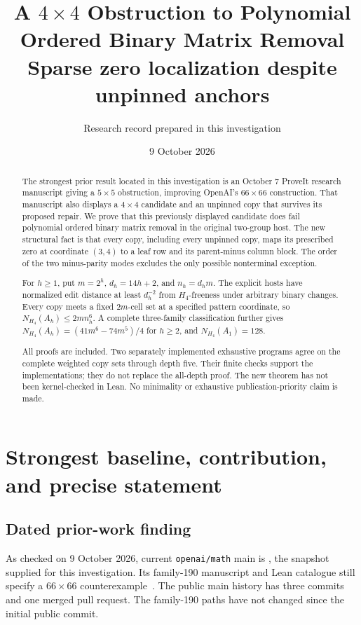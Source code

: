 \documentclass[11pt,a4paper]{article}
\title{\textbf{A \(4\times4\) Obstruction to Polynomial\\Ordered Binary Matrix Removal}\\[6pt]
\large Sparse zero localization despite unpinned anchors}
\author{Research record prepared in this investigation}
\date{9 October 2026}
\theoremstyle{remark}
\newcommand{\Hfour}{H_4}
\begin{document}
\maketitle
\begin{abstract}
The strongest prior result located in this investigation is an October 7
ProveIt research manuscript giving a \(5\times5\) obstruction, improving
OpenAI's \(66\times66\) construction. That manuscript also displays a
\(4\times4\) candidate and an unpinned copy that survives its proposed
repair. We prove that this previously displayed candidate does fail
polynomial ordered binary matrix removal in the original two-group host.
The new structural fact is that every copy, including every unpinned
copy, maps its prescribed zero at coordinate \((3,4)\) to a leaf row and
its parent-minus column block. The order of the two minus-parity modes
excludes the only possible nonterminal exception.

For \(h\ge1\), put \(m=2^h\), \(d_h=14h+2\), and \(n_h=d_hm\).
The explicit hosts have normalized edit distance at least \(d_h^{-2}\)
from \(\Hfour\)-freeness under arbitrary binary changes. Every copy
meets a fixed \(2m\)-cell set at a specified pattern coordinate, so
\(N_{\Hfour}(A_h)\le2mn_h^6\). A complete three-family classification
further gives \(N_{\Hfour}(A_h)=(41m^6-74m^5)/4\) for \(h\ge2\),
and \(N_{\Hfour}(A_1)=128\).

All proofs are included. Two separately implemented exhaustive programs
agree on the complete weighted copy sets through depth five. Their
finite checks support the implementations; they do not replace the
all-depth proof. The new theorem has not been kernel-checked in Lean.
No minimality or exhaustive publication-priority claim is made.
\end{abstract}
\newpage
{\small\tableofcontents}
\newpage

\section{Strongest baseline, contribution, and precise statement}

\subsection{Dated prior-work finding}
As checked on 9 October 2026, current \texttt{openai/math} main is
, the snapshot supplied
for this investigation. Its family-190 manuscript and Lean catalogue
still specify a \(66\times66\) counterexample~\cite{oai,oaiLean}.
The public main history has three commits and one merged pull request.
The family-190 paths have not changed since the initial public commit.
\end{document}
